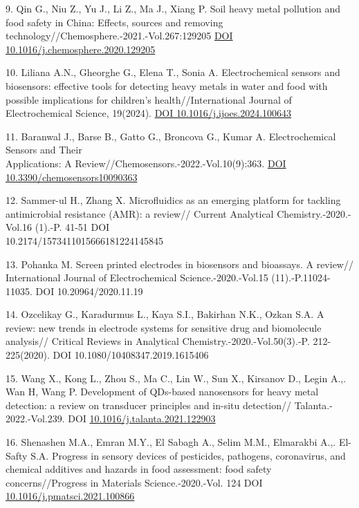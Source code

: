 \begin{references}
9. Qin G., Niu Z., Yu J., Li Z., Ma J., Xiang P. Soil heavy
metal pollution and food safety in China: Effects, sources and
removing technology//Chemosphere.-2021.-Vol.267:129205
\href{https://doi.org/10.1016/j.chemosphere.2020.129205}{DOI\\
10.1016/j.chemosphere.2020.129205}

10. Liliana A.N., Gheorghe G., Elena T., Sonia A. Electrochemical
sensors and biosensors: effective tools for detecting heavy
metals in water and food with possible implications for
children's health//International Journal of Electrochemical
Science, 19(2024).
\href{https://doi.org/10.1016/j.ijoes.2024.100643}{DOI
10.1016/j.ijoes.2024.100643}

11. Baranwal J., Barse B., Gatto G., Broncova G., Kumar A.
Electrochemical Sensors and Their \\Applications: A
Review//Chemosensors.-2022.-Vol.10(9):363.
\href{https://doi.org/10.3390/chemosensors10090363}{DOI
10.3390/chemosensors10090363}

12. Sammer-ul H., Zhang X. Microfluidics as an emerging platform
for tackling antimicrobial resistance (AMR): a review// Current
Analytical Chemistry.-2020.-Vol.16 (1).-P. 41-51
DOI \\10.2174/1573411015666181224145845

13. Pohanka M. Screen printed electrodes in biosensors and
bioassays. A review// International Journal of Electrochemical
Science.-2020.-Vol.15 (11).-P.11024-11035.
DOI 10.20964/2020.11.19

14. Ozcelikay G., Karadurmus L., Kaya S.I., Bakirhan N.K., Ozkan
S.A. A review: new trends in electrode systems for sensitive
drug and biomolecule analysis// Critical Reviews in Analytical
Chemistry.-2020.-Vol.50(3).-P. 212-225(2020). DOI
10.1080/10408347.2019.1615406

15. Wang X., Kong L., Zhou S., Ma C., Lin W., Sun X., Kirsanov
D., Legin A.,. Wan H, Wang P. Development of QDs-based nanosensors
for heavy metal detection: a review on transducer principles and
in-situ detection// Talanta.- 2022.-Vol.239. DOI
\href{https://doi.org/10.1016/j.talanta.2021.122903}{10.1016/j.talanta.2021.122903}

16. Shenashen M.A., Emran M.Y., El Sabagh A., Selim M.M.,
Elmarakbi A.,. El- Safty S.A. Progress in sensory devices of
pesticides, pathogens, coronavirus, and chemical additives and
hazards in food assessment: food safety concerns//Progress in
Materials Science.-2020.-Vol. 124 DOI\\
\href{http://dx.doi.org/10.1016/j.pmatsci.2021.100866}{10.1016/j.pmatsci.2021.100866}


\end{references}
